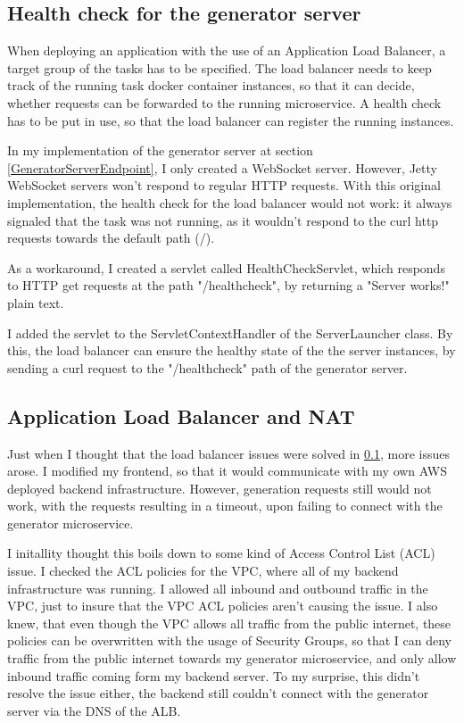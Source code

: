 	\subsection{Health check for the generator server} \label{healthcheck}
		When deploying an application with the use of an Application Load Balancer, a target group of the tasks has to be specified.
		The load balancer needs to keep track of the running task docker container instances, so that it can decide, whether requests can be 
		forwarded to the running microservice. A health check has to be put in use, so that the load balancer can register the running instances.

		In my implementation of the generator server at section \ref{GeneratorServerEndpoint}, I only created a WebSocket server. However, Jetty 
		WebSocket servers won't respond to regular HTTP requests. With this original implementation, the health check for the load balancer would
		not work: it always signaled that the task was not running, as it wouldn't respond to the curl http requests towards the default path (/).

		As a workaround, I created a servlet called HealthCheckServlet, which responds to HTTP get requests at the path "/healthcheck",
		by returning a "Server works!" plain text.

		I added the servlet to the ServletContextHandler of the ServerLauncher class. By this, the load balancer can ensure the healthy state of the 
		the server instances, by sending a curl request to the "/healthcheck" path of the generator server.

	\subsection{Application Load Balancer and NAT} \label{ALB NAT}
		Just when I thought that the load balancer issues were solved in \ref{healthcheck}, more issues arose. I modified my frontend,
		so that it would communicate with my own AWS deployed backend infrastructure. However, generation requests still would not 
		work, with the requests resulting in a timeout, upon failing to connect with the generator microservice.

		I initallity thought this boils down to some kind of Access Control List (ACL) issue. I checked the ACL policies for the VPC, where all
		of my backend infrastructure was running. I allowed all inbound and outbound traffic in the VPC, just to insure that the VPC ACL policies
		aren't causing the issue. I also knew, that even though the VPC allows all traffic from the public internet, these policies can be overwritten
		with the usage of Security Groups, so that I can deny traffic from the public internet towards my generator microservice, and only allow
		inbound traffic coming form my backend server. To my surprise, this didn't resolve the issue either, the backend still couldn't connect
		with the generator server via the DNS of the ALB.

